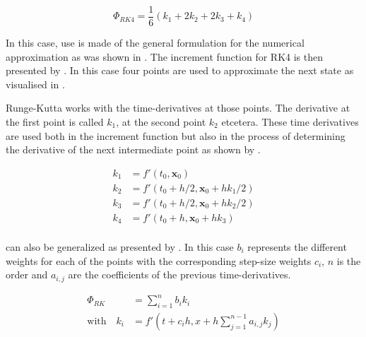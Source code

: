 \begin{equation} \label{eq:rk4_increment}
\Phi_{RK4}=\dfrac{1}{6}\left(k_{1}+2k_{2}+2k_{3}+k_{4}\right)
\end{equation}

\noindent
In this case, use is made of the general formulation for the numerical approximation as was shown in . The increment function for \ac{RK4} is then presented by . In this case four points are used to approximate the next state as visualised in . 

Runge-Kutta works with the time-derivatives at those points. The derivative at the first point is called $k_{1}$, at the second point $k_{2}$ etcetera. These time derivatives are used both in the increment function but also in the process of determining the derivative of the next intermediate point as shown by .

\begin{equation} \label{eq:k}
\begin{split}
k_{1}&=f'\left(t_{0},\mathbf{x}_{0}\right)\\
k_{2}&=f'\left(t_{0}+h/2,\mathbf{x}_{0}+hk_{1}/2\right)\\
k_{3}&=f'\left(t_{0}+h/2,\mathbf{x}_{0}+hk_{2}/2\right)\\
k_{4}&=f'\left(t_{0}+h,\mathbf{x}_{0}+hk_{3}\right)\\
\end{split}
\end{equation}


\noindent
{} can also be generalized as presented by . In this case $b_{i}$ represents the different weights for each of the points with the corresponding step-size weights $c_{i}$, $n$ is the order and $a_{i,j}$ are the coefficients of the previous time-derivatives.

\begin{equation} \label{eq:generalRK}
\begin{split}
\Phi_{RK} &= \displaystyle \sum^{n}_{i=1}b_{i}k_{i} \\
\text{with}\quad k_{i} &= f'\left(t+c_{i}h,x+h\displaystyle \sum^{n-1}_{j=1}a_{i,j}k_{j} \right) \\
\end{split}
\end{equation}

